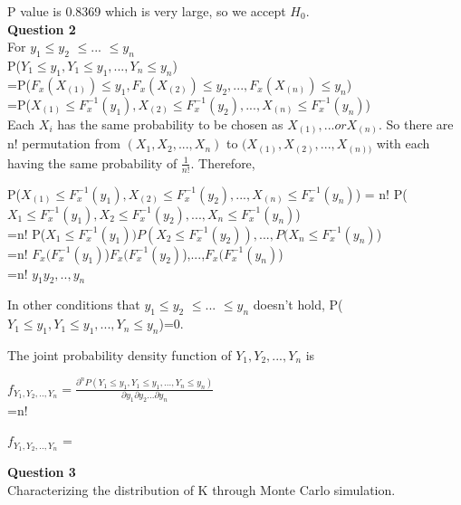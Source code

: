 \documentclass{article}\usepackage[]{graphicx}\usepackage[]{color}
\begin{document}
P value is 0.8369 which is very large, so we accept $H_0$.\\


{\LARGE\bf{Question 2}}\\ %

For $y_1\leq y_2$ $\leq ...$ $ \leq y_n$\\ 
P($Y_1 \leq y_1, Y_1 \leq y_1, ..., Y_n \leq y_n$)\\
=P($F_x (X_{(1)}) \leq y_1, F_x (X_{(2)}) \leq y_2, ..., F_x (X_{(n)}) \leq y_n$)\\
=P($X_{(1)} \leq F_x^{-1} (y_1), X_{(2)} \leq F_x^{-1} (y_2),..., X_{(n)} \leq F_x^{-1} (y_n)$)\\

Each $X_i$ has the same probability to be chosen as $X_{(1)}, ...or X_{(n)}$. So there are n! permutation from $(X_1, X_2,..., X_n)$ to $(X_{(1)}, X_{(2)},..., X_{(n))}$ with each having the same probability of $\frac{1}{n!}$. Therefore,


P($X_{(1)} \leq F_x^{-1} (y_1), X_{(2)} \leq F_x^{-1} (y_2),..., X_{(n)} \leq F_x^{-1} (y_n)$) = n! P($X_1 \leq F_x^{-1} (y_1), X_2 \leq F_x^{-1} (y_2),..., X_n \leq F_x^{-1} (y_n)$)\\
=n! P($X_1 \leq F_x^{-1} (y_1)) P(X_2 \leq F_x^{-1} (y_2)),..., P(X_n \leq F_x^{-1} (y_n)$)\\
=n! $F_x (F_x^{-1} (y_1)$)$F_x (F_x^{-1} (y_2)$),...,$F_x(F_x^{-1} (y_n)$)\\
=n! $y_1 y_2,.., y_n$

In other conditions that $y_1\leq y_2$ $\leq ...$ $ \leq y_n$ doesn't hold, P($Y_1 \leq y_1, Y_1 \leq y_1, ..., Y_n \leq y_n$)=0.

The joint probability density function of $Y_1, Y_2,..., Y_n$ is 

$f_{Y_1,Y_2,..,Y_n} = \frac{\partial^{n}{P(Y_1 \leq y_1, Y_1 \leq y_1, ..., Y_n \leq y_n)}}{\partial{y_1}\partial{y_2}...\partial{y_n}}$\\
=n!

$f_{Y_1,Y_2,..,Y_n}$ =

{\LARGE\bf{Question 3}}\\ %

Characterizing the distribution of K through Monte Carlo simulation.
\end{document}
